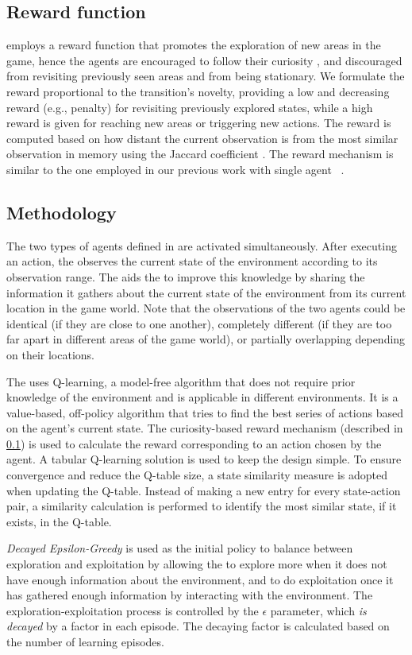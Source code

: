 \subsection{Reward function} \label{subsec:rewardfunction}
\approach employs a reward function that promotes the exploration of new areas in the game, hence the agents are encouraged to follow their curiosity \cite{pathak2017curiosity}, and discouraged from revisiting previously seen areas and from being stationary.
We formulate the reward proportional to the transition's novelty, providing a low and decreasing reward (e.g., penalty) for revisiting previously explored states, while a high reward is given for reaching new areas or triggering new actions.
The reward is computed based on how distant the current observation is from the most similar observation in memory using the Jaccard coefficient \cite{jaccard1912distribution}. The reward mechanism is similar to the one employed in our previous work with single agent \rlacronym~\cite{DBLP:conf/kbse/FerdousKPS22}.

\subsection{Methodology}
The two types of agents defined in \approach are activated simultaneously. 
After executing an action, the \aagent observes the current state of the environment according to its observation range. The \pagent aids the \aagent to improve this knowledge by sharing the information it gathers about the current state of the environment from its current location in the game world. Note that the observations of the two agents could be identical (if they are close to one another), completely different (if they are too far apart in different areas of the game world), or partially overlapping depending on their locations.

The \aagent uses Q-learning, a model-free \rlacronym algorithm that does not require prior knowledge of the environment and is applicable in different environments. It is a value-based, off-policy algorithm that tries to find the best series of actions based on the agent's current state. %
The curiosity-based reward mechanism (described in \ref{subsec:rewardfunction}) is used to calculate the reward corresponding to an action chosen by the agent. A tabular Q-learning solution is used to keep the design simple. To ensure convergence and reduce the Q-table size, a state similarity measure is adopted when updating the Q-table. Instead of making a new entry for every state-action pair, a similarity calculation is performed to identify the most similar state, if it exists, in the Q-table. 

\emph{Decayed Epsilon-Greedy} is used as the initial policy to balance between  exploration and exploitation by allowing the \aagent to explore more when it does not have enough information about the environment, and to do exploitation once it has gathered enough information by interacting with the environment. 
The exploration-exploitation  process is controlled by the $\epsilon$ parameter, which \emph{is decayed} by a factor in each episode. The decaying factor is calculated based on the number of learning episodes.